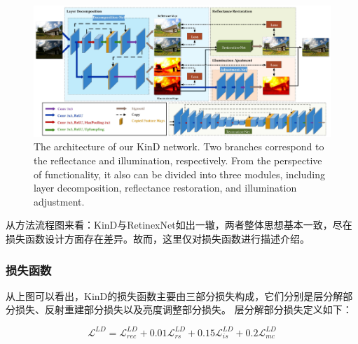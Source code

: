 \documentclass[letterpaper,12pt]{article}
\begin{document}
	\begin{figure}[ht] 
	\centering \includegraphics[width=0.8\columnwidth]{KinD}
	\caption{
		\label{fig:KinD} %
        The architecture of our KinD network. Two branches correspond to the reflectance and illumination, respectively. From the perspective of functionality, it also can be divided into three modules, including layer decomposition, reflectance restoration, and illumination adjustment.
	}
\end{figure}	
	
	从方法流程图来看：KinD与RetinexNet如出一辙，两者整体思想基本一致，尽在损失函数设计方面存在差异。故而，这里仅对损失函数进行描述介绍。
	
	
	\subsubsection{损失函数}
	
	从上图可以看出，KinD的损失函数主要由三部分损失构成，它们分别是层分解部分损失、反射重建部分损失以及亮度调整部分损失。
	层分解部分损失定义如下：
	
	\begin{equation}
		\mathcal{L}^{LD}=\mathcal{L}_{rec}^{LD}+0.01\mathcal{L}_{rs}^{LD}+0.15\mathcal{L}_{is}^{LD}+0.2\mathcal{L}_{mc}^{LD}
    \end{equation}
	
\end{document}
